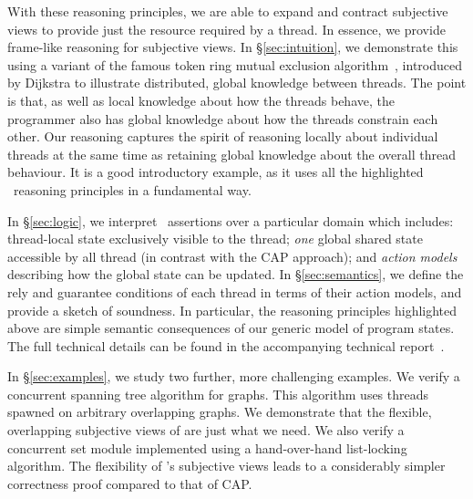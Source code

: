 With these reasoning principles, we are able to expand and contract
subjective views  to provide just the resource required by a thread.
In essence, we provide  frame-like reasoning for  subjective  views. 
In 
\S\ref{sec:intuition}, we 
demonstrate this using 
a variant of the famous  token ring mutual exclusion algorithm~\cite{dijkstra74},
introduced by Dijkstra to illustrate distributed, global knowledge between
threads. The point is that, as well as local knowledge
about how the threads behave, the programmer also has global knowledge
about how the threads constrain each other. Our reasoning captures the
spirit of reasoning locally about individual threads at the same time
as retaining global knowledge about the overall thread behaviour. It
is a good  introductory example, as it uses all the highlighted \colosl\ reasoning principles in a fundamental way. 

In \S\ref{sec:logic}, we interpret \colosl\ assertions
 over a particular domain which includes: thread-local
state exclusively visible to the thread; {\em one} global shared state
accessible by all thread (in contrast with the CAP approach); and {\em
  action models} describing how the global state can be updated.  In
\S\ref{sec:semantics}, we define the rely and guarantee conditions
of each thread in terms of their action models, and provide a
sketch of soundness. In particular, the
reasoning principles highlighted above are simple semantic
consequences of our generic model of program states.  The full
technical details can
be found 
in the accompanying technical report~\cite{colosl-tr14}.



In \S\ref{sec:examples}, we study two further, more challenging
examples. We verify a concurrent spanning tree algorithm for
graphs. This algorithm uses threads spawned on arbitrary overlapping
graphs. We demonstrate that the flexible, overlapping subjective views
of \colosl are just what we need.  We also verify a concurrent set
module implemented using a hand-over-hand list-locking algorithm.
The flexibility of \colosl's subjective views  leads to a
considerably simpler correctness proof compared to that of CAP. 


